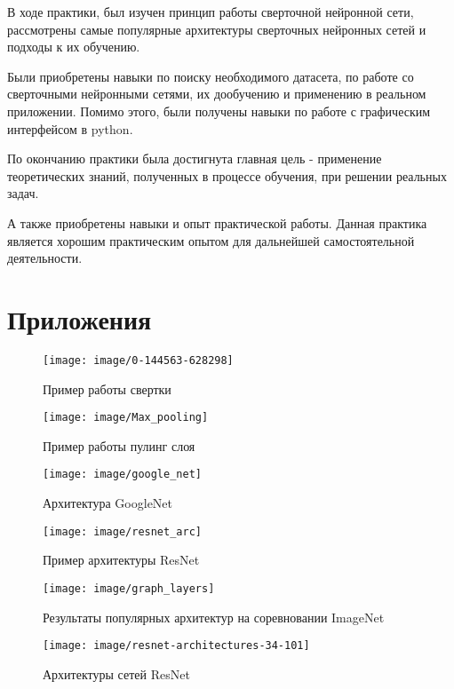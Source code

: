 \documentclass[a4paper,14pt]{article}
\begin{document}
	В ходе практики, был изучен принцип работы сверточной нейронной сети,  рассмотрены самые популярные архитектуры сверточных нейронных сетей и подходы к их обучению.
	
	Были приобретены навыки по поиску необходимого датасета, по работе со сверточными нейронными сетями, их дообучению и применению в реальном приложении.
	Помимо этого, были получены навыки по работе с графическим интерфейсом в python.
	
	По окончанию практики была достигнута главная цель - применение теоретических знаний, полученных в процессе обучения, при решении реальных задач.
	
	А также приобретены навыки и опыт практической работы.
	Данная практика является хорошим практическим опытом для дальнейшей самостоятельной деятельности.
	
	\pagebreak
	\section{Приложения	}
	
	\begin{figure}[H]
		\centering
		\texttt{[image: image/0-144563-628298]}
		\caption{Пример работы свертки}
		\label{fig:0-144563-628298}
	\end{figure}
	
	\begin{figure}[H]
		\centering
		\texttt{[image: image/Max\_pooling]}
		\caption{Пример работы пулинг слоя}
		\label{fig:maxpooling}
	\end{figure}
	
	\begin{figure}[H]
		\centering
		\texttt{[image: image/google\_net]}
		\caption{Архитектура GoogleNet}
		\label{fig:googlenet}
	\end{figure}
	
	
	\begin{figure}[H]
		\centering
		\texttt{[image: image/resnet\_arc]}
		\caption{Пример архитектуры ResNet}
		\label{fig:resnetarc}
	\end{figure}
	
	
	\begin{figure}[H]
		\centering
		\texttt{[image: image/graph\_layers]}
		\caption{Результаты популярных архитектур на соревновании ImageNet}
		\label{fig:graphlayers}
	\end{figure}
	
	\begin{figure}[H]
		\centering
		\texttt{[image: image/resnet-architectures-34-101]}
		\caption{Архитектуры сетей ResNet}
		\label{fig:resnet-architectures-34-101}
	\end{figure}
	
\end{document}
